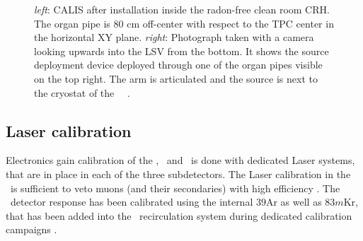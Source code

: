 \begin{figure}[htbp]
 \centering
{}
\caption{\textit{left}: CALIS after installation inside the radon-free clean room CRH. The organ pipe is 80 cm off-center with respect to the TPC center in the horizontal XY plane. \textit{right}: Photograph taken with a camera looking upwards into the LSV from the bottom. It shows the source deployment device deployed through one of the organ pipes visible on the top right. The arm is articulated and the source is next to the cryostat of the \lar\ \tpc\ \cite{Agnes:2015qyz}.
\label{fig:CALIS_photos}}
\end{figure}

\subsection*{Laser calibration}
Electronics gain calibration of the \wcv, \lsv\ and \tpc\ is done with dedicated Laser systems, that are in place in each of the three subdetectors. The Laser calibration in the \wcv\ is sufficient to veto muons (and their secondaries) with high efficiency \cite{Agnes:2015qyz}. The \tpc\ detector response has been calibrated using the internal ${39}$Ar as well as $83m$Kr, that has been added into the \lar\ recirculation system during dedicated calibration campaigns \cite{Agnes:2015gu}.







